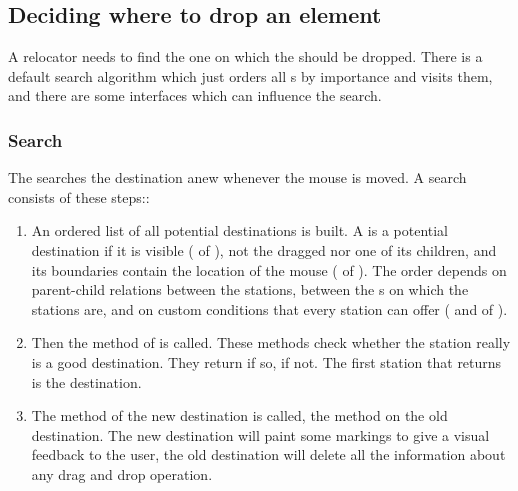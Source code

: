 

\subsection{Deciding where to drop an element}
A relocator needs to find the one  on which the  should be dropped. There is a default search algorithm which just orders all s by importance and visits them, and there are some interfaces which can influence the search.

\subsubsection{Search}
The  searches the destination anew whenever the mouse is moved. A search consists of these steps::
\begin{enumerate}
 \item An ordered list of all potential destinations is built. A  is a potential destination if it is visible ( of ), not the dragged  nor one of its children, and its boundaries contain the location of the mouse ( of ). The order depends on parent-child relations between the stations, between the s on which the stations are, and on custom conditions that every station can offer ( and  of ).
 \item Then the method  of  is called. These methods check whether the station really is a good destination. They return  if so,  if not. The first station that returns  is the destination.
 \item The method  of the new destination is called, the method  on the old destination. The new destination will paint some markings to give a visual feedback to the user, the old destination will delete all the information about any drag and drop operation.
\end{enumerate}

